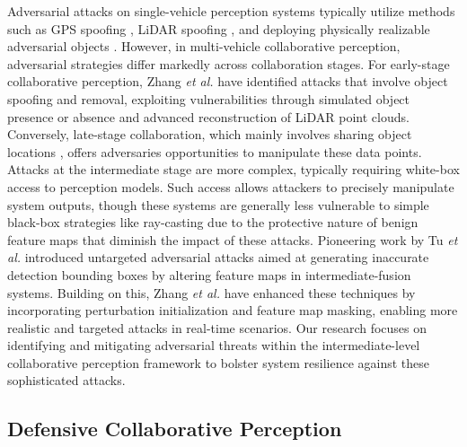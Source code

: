 Adversarial attacks on single-vehicle perception systems typically utilize methods such as GPS spoofing \citep{Li_2021_ICCV}, LiDAR spoofing \citep{279980}, and deploying physically realizable adversarial objects \citep{Tu_2020_CVPR}. However, in multi-vehicle collaborative perception, adversarial strategies differ markedly across collaboration stages.
For early-stage collaborative perception, Zhang \textit{et al.} \citep{zhangDataFabricationCollaborative2023} have identified attacks that involve object spoofing and removal, exploiting vulnerabilities through simulated object presence or absence and advanced reconstruction of LiDAR point clouds. Conversely, late-stage collaboration, which mainly involves sharing object locations \citep{9120490}, offers adversaries opportunities to manipulate these data points.
Attacks at the intermediate stage are more complex, typically requiring white-box access to perception models. Such access allows attackers to precisely manipulate system outputs, though these systems are generally less vulnerable to simple black-box strategies like ray-casting due to the protective nature of benign feature maps that diminish the impact of these attacks.
Pioneering work by Tu \textit{et al.} \citep{tuAdversarialAttacksMultiAgent2021} introduced untargeted adversarial attacks aimed at generating inaccurate detection bounding boxes by altering feature maps in intermediate-fusion systems. Building on this, Zhang \textit{et al.}\citep{zhangDataFabricationCollaborative2023} have enhanced these techniques by incorporating perturbation initialization and feature map masking, enabling more realistic and targeted attacks in real-time scenarios.
Our research focuses on identifying and mitigating adversarial threats within the intermediate-level collaborative perception framework to bolster system resilience against these sophisticated attacks.


\subsection{Defensive Collaborative Perception}

